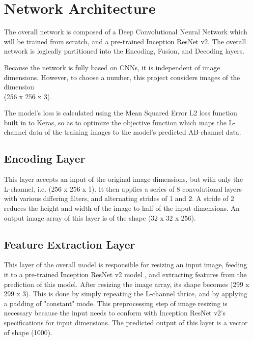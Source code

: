 \documentclass[10pt,twocolumn,letterpaper]{article}
\begin{document}
	\section{Network Architecture}
	The overall network is composed of a Deep Convolutional Neural Network which will be trained from scratch, and a pre-trained Inception ResNet v2. The overall network is logically partitioned into the Encoding, Fusion, and Decoding layers.

	Because the network is fully based on CNNs, it is independent of image dimensions. However, to choose a number, this project considers images of the dimension\\(256 x 256 x 3).

	The model's loss is calculated using the Mean Squared Error L2 loss function built in to Keras, so as to optimize the objective function which maps the L-channel data of the training images to the model's predicted AB-channel data.

	\subsection{Encoding Layer}
	This layer accepts an input of the original image dimensions, but with only the L-channel, i.e. (256 x 256 x 1). It then applies a series of 8 convolutional layers with various differing filters, and alternating strides of 1 and 2. A stride of 2 reduces the height and width of the image to half of the input dimensions. An output image array of this layer is of the shape (32 x 32 x 256).

	\subsection{Feature Extraction Layer}
	This layer of the overall model is responsible for resizing an input image, feeding it to a pre-trained Inception ResNet v2 model \cite{Inception}, and extracting features from the prediction of this model. After resizing the image array, its shape becomes (299 x 299 x 3). This is done by simply repeating the L-channel thrice, and by applying a padding of "constant" mode. This preprocessing step of image resizing is necessary because the input needs to conform with Inception ResNet v2's specifications for input dimensions. The predicted output of this layer is a vector of shape (1000).
\end{document}
